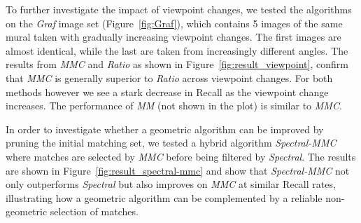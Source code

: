 %
To further investigate the impact of viewpoint changes, we tested the 
algorithms on the \emph{Graf} image set (Figure~\ref{fig:Graf}), which 
contains 5 images of the same mural taken with gradually increasing 
viewpoint changes.  The first images are almost identical, while the 
last are taken from increasingly different angles. The results from   
\emph{MMC} and \emph{Ratio} as shown in 
Figure~\ref{fig:result_viewpoint}, confirm that \emph{MMC} is generally 
superior to \emph{Ratio} across viewpoint changes. For both methods 
however we see a stark decrease in Recall as the viewpoint change 
increases. The performance of \emph{MM} (not shown in the plot) is 
similar to \emph{MMC}.


In order to investigate whether a geometric algorithm can be improved by
pruning the initial matching set, we tested a hybrid algorithm 
\emph{Spectral-MMC} where matches are selected by \emph{MMC} before 
being filtered by \emph{Spectral}. The results are shown in 
Figure~\ref{fig:result_spectral-mmc} and show that \emph{Spectral-MMC} 
not only outperforms \emph{Spectral} but also improves on \emph{MMC} at 
similar Recall rates, illustrating how a geometric algorithm can be 
complemented by a reliable non-geometric selection of matches.


